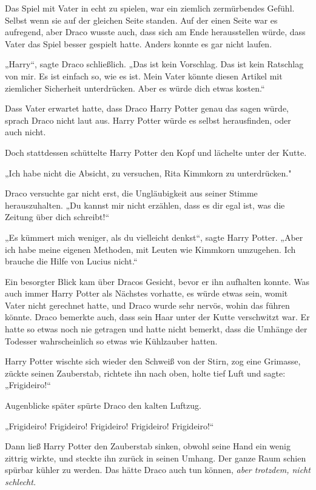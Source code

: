 {Das Spiel mit Vater in echt zu spielen, war ein ziemlich zermürbendes Gefühl. Selbst wenn sie auf der gleichen Seite standen. Auf der einen Seite war es aufregend, aber Draco wusste auch, dass sich am Ende herausstellen würde, dass Vater das Spiel besser gespielt hatte. Anders konnte es gar nicht laufen.

„Harry“, sagte Draco schließlich. „Das ist kein Vorschlag. Das ist kein Ratschlag von mir. Es ist einfach so, wie es ist. Mein Vater könnte diesen Artikel mit ziemlicher Sicherheit unterdrücken. Aber es würde dich etwas kosten.“

Dass Vater erwartet hatte, dass Draco Harry Potter genau das sagen würde, sprach Draco nicht laut aus. Harry Potter würde es selbst herausfinden, oder auch nicht.

Doch stattdessen schüttelte Harry Potter den Kopf und lächelte unter der Kutte.

„Ich habe nicht die Absicht, zu versuchen, Rita Kimmkorn zu unterdrücken."

Draco versuchte gar nicht erst, die Ungläubigkeit aus seiner Stimme herauszuhalten. „Du kannst mir nicht erzählen, dass es dir egal ist, was die Zeitung über dich schreibt!“

„Es kümmert mich weniger, als du vielleicht denkst“, sagte Harry Potter. „Aber ich habe meine eigenen Methoden, mit Leuten wie Kimmkorn umzugehen. Ich brauche die Hilfe von Lucius nicht.“

Ein besorgter Blick kam über Dracos Gesicht, bevor er ihn aufhalten konnte. Was auch immer Harry Potter als Nächstes vorhatte, es würde etwas sein, womit Vater nicht gerechnet hatte, und Draco wurde sehr nervös, wohin das führen könnte. Draco bemerkte auch, dass sein Haar unter der Kutte verschwitzt war. Er hatte so etwas noch nie getragen und hatte nicht bemerkt, dass die Umhänge der Todesser wahrscheinlich so etwas wie Kühlzauber hatten.

Harry Potter wischte sich wieder den Schweiß von der Stirn, zog eine Grimasse, zückte seinen Zauberstab, richtete ihn nach oben, holte tief Luft und sagte: „Frigideiro!“

Augenblicke später spürte Draco den kalten Luftzug.

„Frigideiro! Frigideiro! Frigideiro! Frigideiro! Frigideiro!“

Dann ließ Harry Potter den Zauberstab sinken, obwohl seine Hand ein wenig zittrig wirkte, und steckte ihn zurück in seinen Umhang. Der ganze Raum schien spürbar kühler zu werden. Das hätte Draco auch tun können, \emph{aber trotzdem, nicht schlecht.}

}
